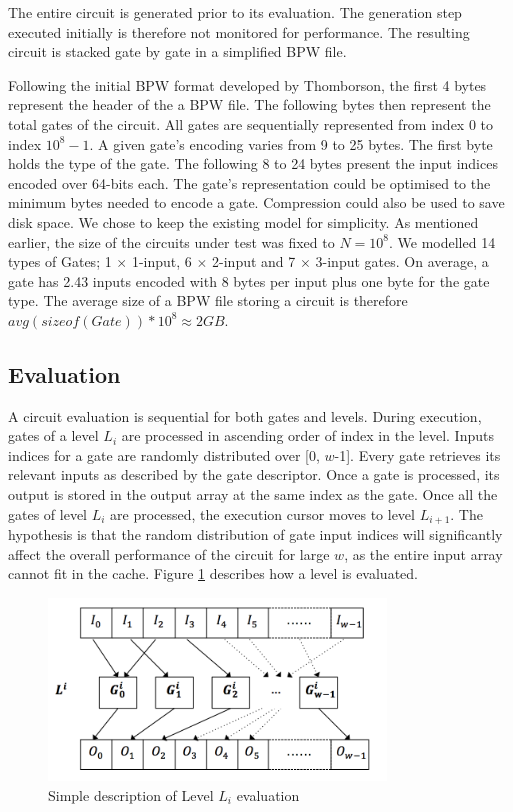 \par
The entire circuit is generated prior to its evaluation. The generation step
executed initially is therefore not monitored for performance. The resulting
circuit is stacked gate by gate in a simplified BPW file.
\par
Following the initial BPW format developed by Thomborson, the first 4 bytes represent
the header of the a BPW file\cite{clark}. The following bytes then represent the
total gates of the circuit. All gates are sequentially represented from index $0$
to index $10^8-1$. A given gate's encoding varies from 9 to 25 bytes. The first
byte holds the type of the gate. The following 8 to 24 bytes present the input
indices encoded over 64-bits each. The gate's representation could be optimised
to the minimum bytes needed to encode a gate. Compression could also be used to
save disk space. We chose to keep the existing model for simplicity. As mentioned
earlier, the size of the circuits under test was fixed to $N = 10^8$. We modelled
14 types of Gates; 1 $\times$ 1-input, 6 $\times$ 2-input and 7 $\times$ 3-input
gates. On average, a gate has 2.43 inputs encoded with 8 bytes per input plus
one byte for the gate type. The average size of a BPW file storing a circuit is
therefore $avg(sizeof(Gate)) * 10^8 \approx 2 GB$.


\subsection{Evaluation}
A circuit evaluation is sequential for both gates and levels. During execution,
gates of a level $L_i$ are processed in ascending order of index in the level.
Inputs indices for a gate are randomly distributed over [0, $w$-1]. Every gate
retrieves its relevant inputs as described by the gate descriptor. Once a gate is
processed, its output is stored in the output array at the same index as the gate.
Once all the gates of level $L_i$ are processed, the execution cursor moves to
level $L_{i+1}$. The hypothesis is that the random distribution of gate input
indices will significantly affect the overall performance of the circuit for
large $w$, as the entire input array cannot fit in the cache. Figure \ref{fig:level}
describes how a level is evaluated.
\begin{figure}[h!]
	\center
	\includegraphics[width=0.8\textwidth]{img/level.png}
	\caption{Simple description of Level $L_i$ evaluation}
	\label{fig:level}
\end{figure}
\par

